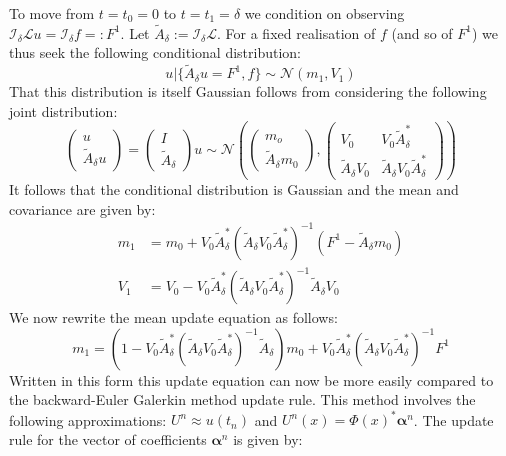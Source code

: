 \documentclass{article}
\theoremstyle{definition}
\theoremstyle{remark}
\theoremstyle{remark}
\begin{document}
To move from $t=t_{0}=0$ to $t=t_{1}=\delta$ we condition on observing $\mathcal{I}_{\delta}\mathcal{L}u=\mathcal{I}_{\delta}f=:F^{1}$. Let $\tilde{A}_{\delta}:=\mathcal{I}_{\delta}\mathcal{L}$. For a fixed realisation of $f$ (and so of $F^{1}$) we thus seek the following conditional distribution:
\begin{equation}
    u|\{\tilde{A}_{\delta}u=F^{1},f\}\sim\mathcal{N}(m_{1},V_{1})
\end{equation}
That this distribution is itself Gaussian follows from considering the following joint distribution:
\begin{equation*}
    \left(\begin{array}{c}u \\ \tilde{A}_{\delta} u\end{array}\right)=\left(\begin{array}{c}I \\ \tilde{A}_{\delta}\end{array}\right) u \sim \mathcal{N}\left(\left(\begin{array}{c}m_{o} \\ \tilde{A}_{\delta}m_{0}\end{array}\right),\left(\begin{array}{cc}V_{0} & V_{0} \tilde{A}_{\delta}^{*} \\ \tilde{A}_{\delta}V_{0} & \tilde{A}_{\delta}V_{0} \tilde{A}_{\delta}^{*}\end{array}\right)\right)
\end{equation*}
It follows that the conditional distribution is Gaussian and the mean and covariance are given by:
\begin{align}
    m_{1}&=m_{0}+V_{0}\tilde{A}_{\delta}^{*}(\tilde{A}_{\delta}V_{0}\tilde{A}_{\delta}^{*})^{-1}(F^{1}-\tilde{A}_{\delta}m_{0}) \\
    V_{1}&=V_{0}-V_{0}\tilde{A}_{\delta}^{*}(\tilde{A}_{\delta}V_{0}\tilde{A}_{\delta}^{*})^{-1}\tilde{A}_{\delta}V_{0}
\end{align}
We now rewrite the mean update equation as follows:
\begin{equation}
    \label{new_method_update}
    m_{1}=\left(1-V_{0}\tilde{A}_{\delta}^{*}(\tilde{A}_{\delta}V_{0}\tilde{A}_{\delta}^{*})^{-1}\tilde{A}_{\delta}\right)m_{0}+V_{0}\tilde{A}_{\delta}^{*}(\tilde{A}_{\delta}V_{0}\tilde{A}_{\delta}^{*})^{-1}F^{1}
\end{equation}
Written in this form this update equation can now be more easily compared to the backward-Euler Galerkin method update rule. This method involves the following approximations: $U^{n}\approx u(t_n)$ and $U^{n}(x)=\Phi(x)^{*}\boldsymbol{\alpha}^{n}$. The update rule for the vector of coefficients $\boldsymbol{\alpha}^{n}$ is given by:
\end{document}
